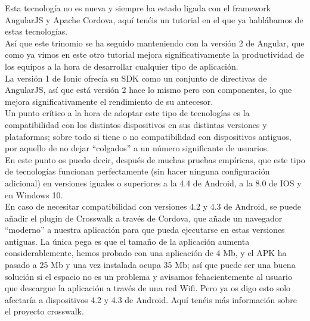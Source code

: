 \documentclass[a4paper, 11pt]{article}
\begin{document}
\begin{itemize}
              Esta tecnología no es nueva y siempre ha estado ligada con el framework AngularJS y Apache
              Cordova, aquí tenéis un tutorial en el que ya hablábamos de estas tecnologías.\\

              Así que este trinomio se ha seguido manteniendo con la versión 2 de Angular, que como ya
              vimos en este otro tutorial mejora significativamente la productividad de los equipos a
              la hora de desarrollar cualquier tipo de aplicación.\\

              La versión 1 de Ionic ofrecía su SDK como un conjunto de directivas de AngularJS, así que
              está versión 2 hace lo mismo pero con componentes, lo que mejora significativamente el
              rendimiento de su antecesor.\\

              Un punto crítico a la hora de adoptar este tipo de tecnologías es la compatibilidad con
              los distintos dispositivos en sus distintas versiones y plataformas; sobre todo si tiene
              o no compatibilidad con dispositivos antiguos, por aquello de no dejar “colgados” a un
              número significante de usuarios.\\

              En este punto os puedo decir, después de muchas pruebas empíricas, que este tipo de
              tecnologías funcionan perfectamente (sin hacer ninguna configuración adicional) en
              versiones iguales o superiores a la 4.4 de Android, a la 8.0 de IOS y en Windows 10.\\

              En caso de necesitar compatibilidad con versiones 4.2 y 4.3 de Android, se puede
              añadir el plugin de Crosswalk a través de Cordova, que añade un navegador “moderno”
              a nuestra aplicación para que pueda ejecutarse en estas versiones antiguas.
              La única pega es que el tamaño de la aplicación aumenta considerablemente, hemos
              probado con una aplicación de 4 Mb, y el APK ha pasado a 25 Mb y una vez
              instalada ocupa 35 Mb; así que puede ser una buena solución si el espacio no es
              un problema y avisamos fehacientemente al usuario que descargue la aplicación a
              través de una red Wifi. Pero ya os digo esto solo afectaría a dispositivos 4.2 y
              4.3 de Android. Aquí tenéis más información sobre el proyecto crosswalk.\\


\end{itemize}
\end{document}
